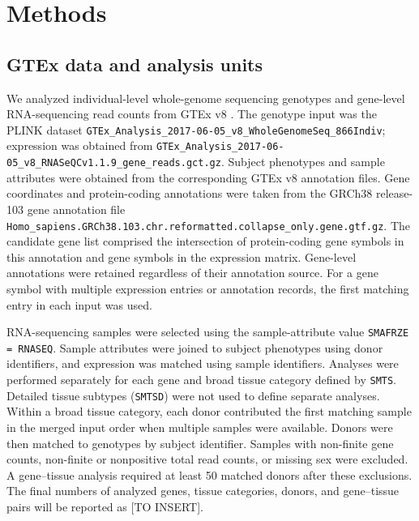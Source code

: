 \documentclass[12pt]{article}
\begin{document}
\newpage

\section{Methods}


\subsection{GTEx data and analysis units}
We analyzed individual-level whole-genome sequencing genotypes and gene-level
RNA-sequencing read counts from GTEx v8 \cite{gtex_consortium_gtex_2020}.
The genotype input was the PLINK dataset
\texttt{GTEx\_Analysis\_2017-06-05\_v8\_WholeGenomeSeq\_866Indiv};
expression was obtained from
\texttt{GTEx\_Analysis\_2017-06-05\_v8\_RNASeQCv1.1.9\_gene\_reads.gct.gz}.
Subject phenotypes and sample attributes were obtained from the corresponding
GTEx v8 annotation files. Gene coordinates and protein-coding annotations
were taken from the GRCh38 release-103 gene annotation file
\texttt{Homo\_sapiens.GRCh38.103.chr.reformatted.collapse\_only.gene.gtf.gz}.
The candidate gene list comprised the intersection of protein-coding gene
symbols in this annotation and gene symbols in the expression matrix.
Gene-level annotations were retained regardless of their annotation source.
For a gene symbol with multiple expression entries or annotation records,
the first matching entry in each input was used.

RNA-sequencing samples were selected using the sample-attribute value
\texttt{SMAFRZE = RNASEQ}. Sample attributes were joined to subject phenotypes
using donor identifiers, and expression was matched using sample identifiers.
Analyses were performed separately for each gene and broad tissue category
defined by \texttt{SMTS}. Detailed tissue subtypes (\texttt{SMTSD}) were not
used to define separate analyses. Within a broad tissue category, each donor
contributed the first matching sample in the merged input order when multiple
samples were available. Donors were then matched to genotypes by subject
identifier. Samples with non-finite gene counts, non-finite or nonpositive
total read counts, or missing sex were excluded. A gene--tissue analysis
required at least 50 matched donors after these exclusions. The final numbers
of analyzed genes, tissue categories, donors, and gene--tissue pairs will be
reported as [TO INSERT].
\end{document}
